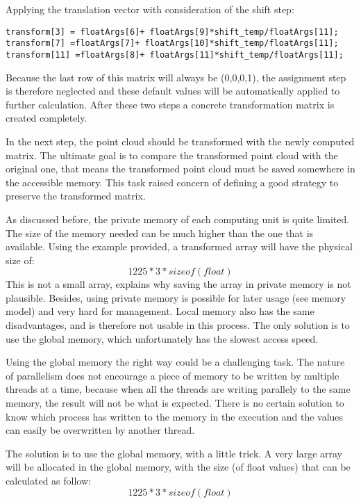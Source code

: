 Applying the translation vector with consideration of the shift step:
\begin{lstlisting}
transform[3] = floatArgs[6]+ floatArgs[9]*shift_temp/floatArgs[11];
transform[7] =floatArgs[7]+ floatArgs[10]*shift_temp/floatArgs[11];
transform[11] =floatArgs[8]+ floatArgs[11]*shift_temp/floatArgs[11];
\end{lstlisting}
Because the last row of this matrix will always be (0,0,0,1), the assignment step is therefore neglected and these default values will be automatically applied to further calculation. After these two steps a concrete transformation matrix is created completely.

In the next step, the point cloud should be transformed with the newly computed matrix. The ultimate goal is to compare the transformed point cloud with the original one, that means the transformed point cloud must be saved somewhere in the accessible memory. This task raised concern of defining a good strategy to preserve the transformed matrix.

As discussed before, the private memory of each computing unit is quite limited. The size of the memory needed can be much higher than the one that is available. Using the example provided, a transformed array will have the physical size of:
\begin{equation*}
    1225*3*sizeof(float)
\end{equation*}
This is not a small array, explains why saving the array in private memory is not plausible. Besides, using private memory is possible for later usage (see memory model) and very hard for management. Local memory also has the same disadvantages, and is therefore not usable in this process. The only solution is to use the global memory, which unfortunately has the slowest access speed.

Using the global memory the right way could be a challenging task. The nature of parallelism does not encourage a piece of memory to be written by multiple threads at a time, because when all the threads are writing parallely to the same memory, the result will not be what is expected. There is no certain solution to know which process has written to the memory in the execution and the values can easily be overwritten by another thread. 

The solution is to use the global memory, with a little trick. A very large array will be allocated in the global memory, with the size (of float values) that can be calculated as follow:
\begin{equation*}
    1225*3*sizeof(float)
\end{equation*}

